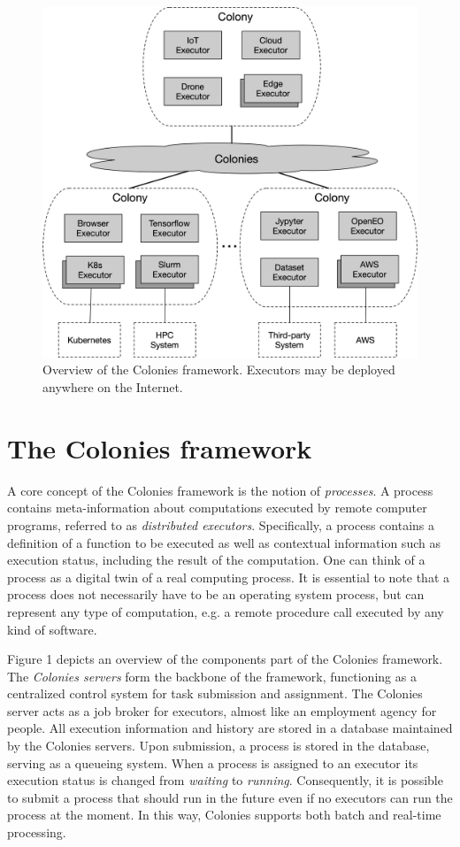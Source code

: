 \documentclass{article}
\begin{document}
\begin{figure}[t]
	\centering
    \includegraphics[scale=0.45]{overview.png}
	\caption{Overview of the Colonies framework. Executors may be deployed anywhere on the Internet.}
	\label{fig:overview}
\end{figure}

\section{The Colonies framework}
\label{sec:headings}
A core concept of the Colonies framework is the notion of \emph{processes}. A process contains meta-information about computations executed by remote computer programs, referred to as \emph{distributed executors}. Specifically, a process contains a definition of a function to be executed as well as contextual information such as execution status, including the result of the computation. One can think of a process as a digital twin of a real computing process. It is essential to note that a process does not necessarily have to be an operating system process, but can represent any type of computation, e.g. a remote procedure call executed by any kind of software. 

Figure 1 depicts an overview of the components part of the Colonies framework. The \emph{Colonies servers} form the backbone of the framework, functioning as a centralized control system for task submission and assignment. The Colonies server acts as a job broker for executors, almost like an employment agency for people. All execution information and history are stored in a database maintained by the Colonies servers. Upon submission, a process is stored in the database, serving as a queueing system. When a process is assigned to an executor its execution status is changed from \emph{waiting} to \emph{running}. Consequently, it is possible to submit a process that should run in the future even if no executors can run the process at the moment. In this way, Colonies supports both batch and real-time processing. 
\end{document}
